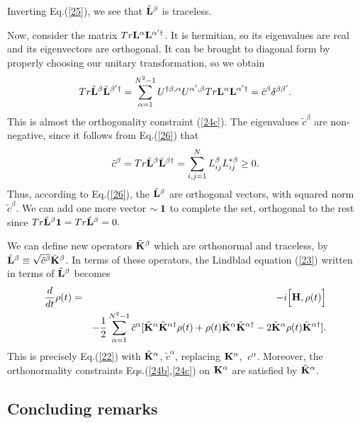 \documentclass[aps,pra,amssymb, amsfonts,amsmath,showpacs, superscriptaddress,12pt]{revtex4}
\begin{document}
Inverting Eq.(\ref{25}), we see that $\tilde{\bf L}^{\beta}$ is traceless. 

Now, consider the matrix $Tr{\bf L}^{\alpha}{\bf L}^{\alpha'\dagger}$.  It is hermitian, so its eigenvalues are real and its eigenvectors are orthogonal.  It can be brought to diagonal form by properly choosing our unitary transformation, so we obtain
\begin{equation}\label{26}
Tr \tilde{\bf L}^{\beta}\tilde{\bf L}^{\beta'\dagger}=\sum_{\alpha=1}^{N^{2}-1}U^{\dagger\beta, \alpha} U^{\alpha', \beta}Tr{\bf L}^{\alpha}{\bf L}^{\alpha'\dagger}=\tilde c^{\beta}\delta^{\beta\beta'}.
\end{equation}
This is almost the orthogonality constraint  (\ref{24c}).  The eigenvalues $\tilde c^{\beta}$ are non-negative, since it follows from Eq.(\ref{26}) that 
\[
\tilde c^{\beta}=Tr \tilde{\bf L}^{\beta}\tilde{\bf L}^{\beta\dagger}= \sum_{i,j=1}^{N}L_{ij}^{\beta}L_{ij}^{*\beta}\geq 0.
\]
Thus, according to Eq.(\ref{26}), the $\tilde{\bf L}^{\beta}$  are orthogonal vectors, 
with squared norm $\tilde c^{\beta}$.  We can add one more vector $\sim {\bf 1}$ to complete the set, orthogonal to the rest since $Tr \tilde{\bf L}^{\beta}{\bf 1}=Tr \tilde{\bf L}^{\beta}=0.$

We can define  new operators $\tilde{\bf K}^{\beta}$ which are orthonormal and traceless, by $\tilde{\bf L}^{\beta}\equiv\sqrt{\tilde c^{\beta}}\tilde{\bf K}^{\beta}$.  In terms of these operators, the Lindblad equation (\ref{23}) written in terms of $\tilde{\bf L}^{\beta}$ becomes
\begin{eqnarray}\label{27}
\frac{d}{dt}{\bf\rho}(t)&=&-i\Big[{\bf H}, {\bf\rho}(t)\Big]\nonumber\\
&&-\frac{1}{2}\sum_{\alpha=1}^{N^{2}-1}\tilde c^{\alpha}[\tilde{\bf K}^{\alpha}\tilde{\bf K}^{\alpha\dagger} {\bf\rho}(t)+ {\bf\rho}(t)\tilde{\bf K}^{\alpha}\tilde{\bf K}^{\alpha\dagger}-2\tilde{\bf K}^{\alpha}{\bf\rho}(t)\tilde{\bf K}^{\alpha\dagger}].\nonumber\\
 \end{eqnarray}
\noindent This is precisely Eq.(\ref{22}) with $\tilde{\bf K}^{\alpha}$, $\tilde c^{\alpha}$, replacing ${\bf K}^{\alpha}$, $\ c^{\alpha}$.  Moreover, the orthonormality constraints Eqs.(\ref{24b},\ref{24c}) on ${\bf K}^{\alpha}$ are satisfied by $\tilde{\bf K}^{\alpha}$.  

\subsection{Concluding remarks}
 
\end{document}
